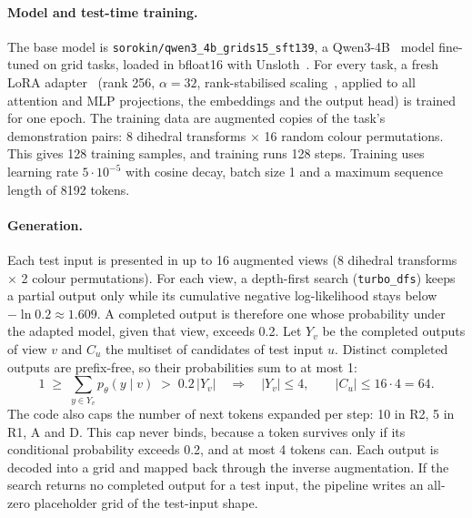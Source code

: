 \documentclass[11pt]{article}
\newcommand{\code}[1]{\texttt{#1}}
\newcommand{\R}[1]{R#1}
\begin{document}
\paragraph{Model and test-time training.}
The base model is \code{sorokin/qwen3\_4b\_grids15\_sft139}, a Qwen3-4B~\citep{qwen3} model fine-tuned on grid tasks, loaded in bfloat16 with Unsloth~\citep{unsloth}.
For every task, a fresh LoRA adapter~\citep{hu2021lora} (rank 256, $\alpha=32$, rank-stabilised scaling~\citep{kalajdzievski2023rslora}, applied to all attention and MLP projections, the embeddings and the output head) is trained for one epoch. The training data are augmented copies of the task's demonstration pairs: 8 dihedral transforms $\times$ 16 random colour permutations. This gives 128 training samples, and training runs 128 steps. Training uses learning rate $5\cdot10^{-5}$ with cosine decay, batch size 1 and a maximum sequence length of 8192 tokens.

\paragraph{Generation.}
Each test input is presented in up to 16 augmented views (8 dihedral transforms $\times$ 2 colour permutations). For each view, a depth-first search (\code{turbo\_dfs}) keeps a partial output only while its cumulative negative log-likelihood stays below $-\ln 0.2 \approx 1.609$. A completed output is therefore one whose probability under the adapted model, given that view, exceeds 0.2.
Let $Y_v$ be the completed outputs of view $v$ and $C_u$ the multiset of candidates of test input $u$. Distinct completed outputs are prefix-free, so their probabilities sum to at most 1:
\begin{equation}
\label{eq:bound}
1 \;\ge\; \sum_{y\in Y_v} p_\theta(y\mid v) \;>\; 0.2\,|Y_v|
\quad\Longrightarrow\quad |Y_v|\le 4, \qquad |C_u| \le 16\cdot 4 = 64 .
\end{equation}
The code also caps the number of next tokens expanded per step: 10 in \R{2}, 5 in \R{1}, A and D. This cap never binds, because a token survives only if its conditional probability exceeds 0.2, and at most 4 tokens can.
Each output is decoded into a grid and mapped back through the inverse augmentation.
If the search returns no completed output for a test input, the pipeline writes an all-zero placeholder grid of the test-input shape.
\end{document}

